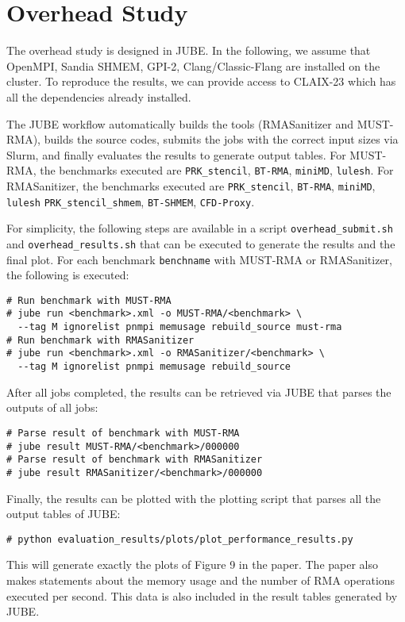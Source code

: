 \documentclass[twoside]{article}
\begin{document}
\section*{Overhead Study}
The overhead study is designed in JUBE.
In the following, we assume that OpenMPI, Sandia SHMEM, GPI-2, Clang/Classic-Flang are installed on the cluster.
To reproduce the results, we can provide access to CLAIX-23 which has all the dependencies already installed.

The JUBE workflow automatically builds the tools (RMASanitizer and MUST-RMA), builds the source codes, submits the jobs with the correct input sizes via Slurm, and finally evaluates the results to generate output tables.
For MUST-RMA, the benchmarks executed are \texttt{PRK\_stencil}, \texttt{BT-RMA}, \texttt{miniMD}, \texttt{lulesh}.
For RMASanitizer, the benchmarks executed are \texttt{PRK\_stencil}, \texttt{BT-RMA},  \texttt{miniMD}, \texttt{lulesh} \texttt{PRK\_stencil\_shmem}, \texttt{BT-SHMEM}, \texttt{CFD-Proxy}.

For simplicity, the following steps are available in a script \texttt{overhead\_submit.sh} and \texttt{overhead\_results.sh} that can be executed to generate the results and the final plot.
For each benchmark \texttt{benchname} with MUST-RMA or RMASanitizer, the following is executed:

{
\small
\begin{verbatim}
# Run benchmark with MUST-RMA
# jube run <benchmark>.xml -o MUST-RMA/<benchmark> \
  --tag M ignorelist pnmpi memusage rebuild_source must-rma
# Run benchmark with RMASanitizer
# jube run <benchmark>.xml -o RMASanitizer/<benchmark> \
  --tag M ignorelist pnmpi memusage rebuild_source
\end{verbatim}
}

After all jobs completed, the results can be retrieved via JUBE that parses the outputs of all jobs:

{
\small
\begin{verbatim}
# Parse result of benchmark with MUST-RMA
# jube result MUST-RMA/<benchmark>/000000
# Parse result of benchmark with RMASanitizer
# jube result RMASanitizer/<benchmark>/000000
\end{verbatim}
}

Finally, the results can be plotted with the plotting script that parses all the output tables of JUBE:
{
\small
\begin{verbatim}
# python evaluation_results/plots/plot_performance_results.py
\end{verbatim}
}

This will generate exactly the plots of Figure 9 in the paper. The paper also makes statements about the memory usage and the number of RMA operations executed per second. This data is also included in the result tables generated by JUBE.
\end{document}
